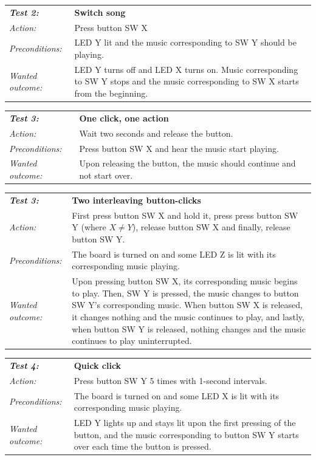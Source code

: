 \documentclass[a4paper,12pt]{article}
\begin{document}
\begin{tabular}[h]{|lp{12cm}|} \hline
\textbf{\emph{Test 2:}} 		& \textbf{Switch song}\\
\emph{Action:} 		& Press button SW X\\
\emph{Preconditions:}	& LED Y lit and the music corresponding to SW Y should be playing.\\
\emph{Wanted outcome:}	& LED Y turns off and LED X turns on. Music corresponding to SW Y stops and the music corresponding to SW X starts from the beginning.\\ \hline
\end{tabular}
\vspace{1cm}

\begin{tabular}[h]{|lp{12cm}|} \hline
\textbf{\emph{Test 3:}} 		& \textbf{One click, one action}\\
\emph{Action:} 		& Wait two seconds and release the button.\\
\emph{Preconditions:}	& Press button SW X and hear the music start playing.\\
\emph{Wanted outcome:}	& Upon releasing the button, the music should continue and not start over. \\ \hline
\end{tabular}
\vspace{1cm}

\begin{tabular}[h]{|lp{12cm}|} \hline
\textbf{\emph{Test 3:}} 		& \textbf{Two interleaving button-clicks}\\
\emph{Action:} 		& First press button SW X and hold it, press press button SW Y (where $X \neq Y$), release button SW X and finally, release button SW Y. \\
\emph{Preconditions:}	& The board is turned on and some LED Z is lit with its corresponding music playing.\\
\emph{Wanted outcome:}	& Upon pressing button SW X, its corresponding music begins to play. Then, SW Y is pressed, the music changes to button SW Y's corresponding music. When button SW X is released, it changes nothing and the music continues to play, and lastly, when button SW Y is released, nothing changes and the music continues to play uninterrupted. \\ \hline
\end{tabular}
\vspace{1cm}

\begin{tabular}[h]{|lp{12cm}|} \hline
\textbf{\emph{Test 4:}} 		& \textbf{Quick click}\\
\emph{Action:} 		& Press button SW Y 5 times with 1-second intervals.\\
\emph{Preconditions:}	& The board is turned on and some LED X is lit with its corresponding music playing.\\
\emph{Wanted outcome:}	& LED Y lights up and stays lit upon the first pressing of the button, and the music corresponding to button SW Y starts over each time the button is pressed.\\ \hline
\end{tabular}
\end{document}
